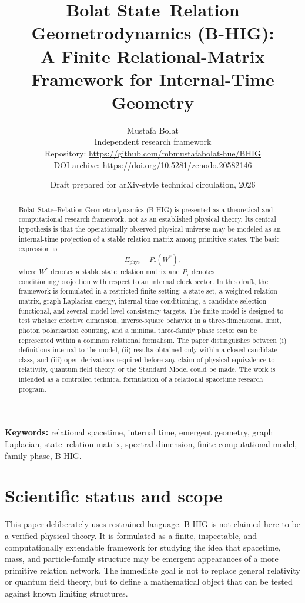 \documentclass[11pt,a4paper]{article}
\title{Bolat State--Relation Geometrodynamics (B-HIG):\\
A Finite Relational-Matrix Framework for Internal-Time Geometry}
\author{Mustafa Bolat\\
\small Independent research framework\\
\small Repository: \url{https://github.com/mbmustafabolat-hue/BHIG}\\
\small DOI archive: \url{https://doi.org/10.5281/zenodo.20582146}}
\date{Draft prepared for arXiv-style technical circulation, 2026}
\newcommand{\BHIG}{B-HIG}
\newcommand{\Wstar}{W^{\ast}}
\newcommand{\Ephys}{E_{\mathrm{phys}}}
\begin{document}
\maketitle

\begin{abstract}
Bolat State--Relation Geometrodynamics (\BHIG) is presented as a theoretical and computational research framework, not as an established physical theory. Its central hypothesis is that the operationally observed physical universe may be modeled as an internal-time projection of a stable relation matrix among primitive states. The basic expression is
\[
\boxed{\Ephys=P_{\tau}(\Wstar)} ,
\]
where $\Wstar$ denotes a stable state--relation matrix and $P_{\tau}$ denotes conditioning/projection with respect to an internal clock sector. In this draft, the framework is formulated in a restricted finite setting: a state set, a weighted relation matrix, graph-Laplacian energy, internal-time conditioning, a candidate selection functional, and several model-level consistency targets. The finite model is designed to test whether effective dimension, inverse-square behavior in a three-dimensional limit, photon polarization counting, and a minimal three-family phase sector can be represented within a common relational formalism. The paper distinguishes between (i) definitions internal to the model, (ii) results obtained only within a closed candidate class, and (iii) open derivations required before any claim of physical equivalence to relativity, quantum field theory, or the Standard Model could be made. The work is intended as a controlled technical formulation of a relational spacetime research program.
\end{abstract}

\noindent\textbf{Keywords:} relational spacetime, internal time, emergent geometry, graph Laplacian, state--relation matrix, spectral dimension, finite computational model, family phase, B-HIG.

\section{Scientific status and scope}
This paper deliberately uses restrained language. \BHIG{} is not claimed here to be a verified physical theory. It is formulated as a finite, inspectable, and computationally extendable framework for studying the idea that spacetime, mass, and particle-family structure may be emergent appearances of a more primitive relation network. The immediate goal is not to replace general relativity or quantum field theory, but to define a mathematical object that can be tested against known limiting structures.
\end{document}
